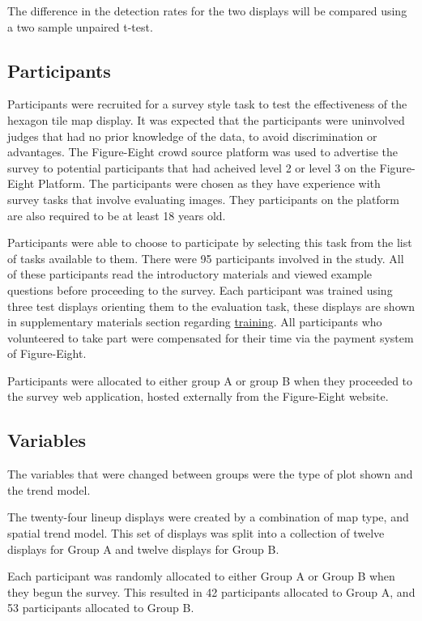 \documentclass[conference,final,]{IEEEtran}
\begin{document}
The difference in the detection rates for the two displays will be
compared using a two sample unpaired t-test.

\hypertarget{participants}{%
\subsection{Participants}\label{participants}}

Participants were recruited for a survey style task to test the
effectiveness of the hexagon tile map display. It was expected that the
participants were uninvolved judges that had no prior knowledge of the
data, to avoid discrimination or advantages. The Figure-Eight crowd
source platform was used to advertise the survey to potential
participants that had acheived level 2 or level 3 on the Figure-Eight
Platform. The participants were chosen as they have experience with
survey tasks that involve evaluating images. They participants on the
platform are also required to be at least 18 years old.

Participants were able to choose to participate by selecting this task
from the list of tasks available to them. There were 95 participants
involved in the study. All of these participants read the introductory
materials and viewed example questions before proceeding to the survey.
Each participant was trained using three test displays orienting them to
the evaluation task, these displays are shown in supplementary materials
section regarding \protect\hyperlink{training}{training}. All
participants who volunteered to take part were compensated for their
time via the payment system of Figure-Eight.

Participants were allocated to either group A or group B when they
proceeded to the survey web application, hosted externally from the
Figure-Eight website.

\hypertarget{variables}{%
\subsection{Variables}\label{variables}}

The variables that were changed between groups were the type of plot
shown and the trend model.

The twenty-four lineup displays were created by a combination of map
type, and spatial trend model. This set of displays was split into a
collection of twelve displays for Group A and twelve displays for Group
B.

Each participant was randomly allocated to either Group A or Group B
when they begun the survey. This resulted in 42 participants allocated
to Group A, and 53 participants allocated to Group B.
\end{document}
